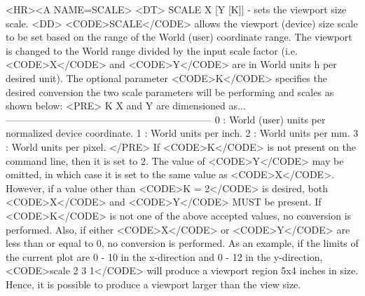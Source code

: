 \begin{rawhtml}
<HR><A NAME=SCALE>
<DT>
SCALE X [Y [K]] - sets the viewport size scale.
<DD>
	<CODE>SCALE</CODE> allows the viewport (device) size scale to be
	set based on the range of the World (user) coordinate range.  The
	viewport is changed to the World range divided by the input scale
	factor (i.e. <CODE>X</CODE> and <CODE>Y</CODE> are in World units h
	per desired unit).  The optional parameter <CODE>K</CODE> specifies
	the desired conversion the two scale parameters will be performing
	and scales as shown below:
	<PRE>
    K   X and Y are dimensioned as...
---------------------------------------------------------------
    0 : World (user) units per normalized device coordinate.
    1 : World units per inch.
    2 : World units per mm.
    3 : World units per pixel.
	</PRE>
	If <CODE>K</CODE> is not present on the command line, then it is
	set to 2.  The value of <CODE>Y</CODE> may be omitted, in which
	case it is set to the same value as <CODE>X</CODE>.  However,
	if a value other than <CODE>K = 2</CODE> is desired, both
	<CODE>X</CODE> and <CODE>Y</CODE> MUST be present.  If <CODE>K</CODE>
	is not one of the above accepted values, no conversion is performed.
	Also, if either <CODE>X</CODE> or <CODE>Y</CODE> are less than
	or equal to 0, no conversion is performed.  As an example,
	if the limits of the current plot are 0 - 10 in the x-direction and
	0 - 12 in the y-direction, <CODE>scale 2 3 1</CODE> will produce
	a viewport region 5x4 inches in size.  Hence, it is possible to
	produce a viewport larger than the view size.


\end{rawhtml}
